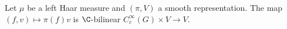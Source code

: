 Let $\mu$ be a left Haar measure and $(\pi,V)$ a smooth representation. The map $(f,v)\mapsto\pi(f)v$ is $\C$-bilinear $C_c^\infty(G)\times V\to V$.
